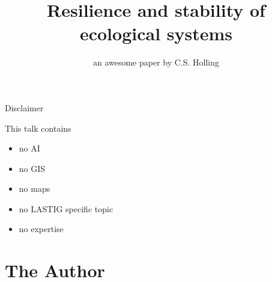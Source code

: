 \documentclass[11,aspectratio=1610]{beamer}
\title{Resilience and stability of ecological systems}
\subtitle{an awesome paper by C.S. Holling}
\date{}
\author{}
\begin{document}
\maketitle  




\begin{frame}{Disclaimer}

This talk contains 
\begin{itemize}
  \item no AI
  \item no GIS
  \item no maps
  \item no LASTIG specific topic
  \item no expertise
\end{itemize}

\end{frame}


\section{The Author} 
\end{document}
